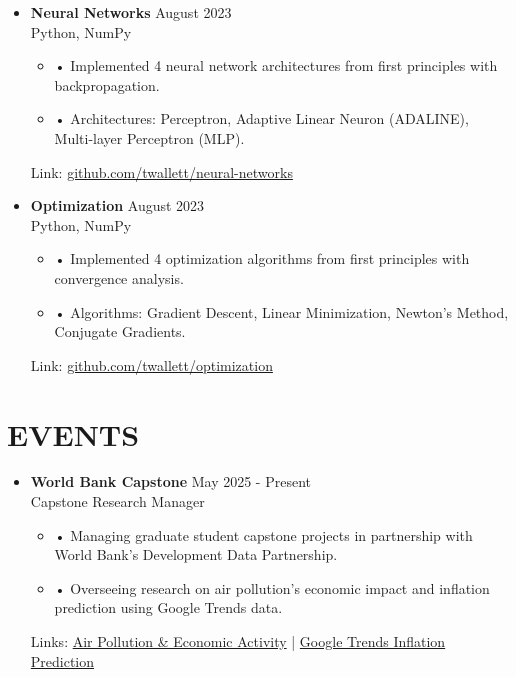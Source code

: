 \documentclass[a4paper,9pt]{extarticle}
\newcommand{\shorturl}[2]{%
  \href{#1}{#2}%
}
\begin{document}
\begin{itemize}[leftmargin=0.4cm, label={}]
    \item \textbf{Neural Networks} \hfill August 2023 \\
    Python, NumPy
    \begin{itemize}[leftmargin=0.3cm, label={}]
    \item \small{•} \normalsize{Implemented 4 neural network architectures from first principles with backpropagation.} 
    \item \small{•} \normalsize{Architectures: Perceptron, Adaptive Linear Neuron (ADALINE), Multi-layer Perceptron (MLP).} 
    \end{itemize}
    Link: \shorturl{https://github.com/twallett/neural-networks}{github.com/twallett/neural-networks}
\end{itemize}

\begin{itemize}[leftmargin=0.4cm, label={}]
    \item \textbf{Optimization} \hfill August 2023 \\
    Python, NumPy
    \begin{itemize}[leftmargin=0.3cm, label={}]
    \item \small{•} \normalsize{Implemented 4 optimization algorithms from first principles with convergence analysis.} 
    \item \small{•} \normalsize{Algorithms: Gradient Descent, Linear Minimization, Newton's Method, Conjugate Gradients.} 
    \end{itemize}
    Link: \shorturl{https://github.com/twallett/optimization}{github.com/twallett/optimization}
\end{itemize}


\section*{EVENTS}

\begin{itemize}[leftmargin=0.5cm, label={}]
    \item \textbf{World Bank Capstone} \hfill May 2025 - Present \\
    Capstone Research Manager 
    \begin{itemize}[leftmargin=0.3cm, label={}]
    \item \small{•} \normalsize{Managing graduate student capstone projects in partnership with World Bank's Development Data Partnership.} 
    \item \small{•} \normalsize{Overseeing research on air pollution's economic impact and inflation prediction using Google Trends data.}
    \end{itemize}
    Links: \shorturl{https://datapartnership.org/air-pollution-economic-analysis/README.html}{Air Pollution \& Economic Activity} | \shorturl{https://datapartnership.org/google-trends-inflation/README.html}{Google Trends Inflation Prediction} 
\end{itemize}
\end{document}
